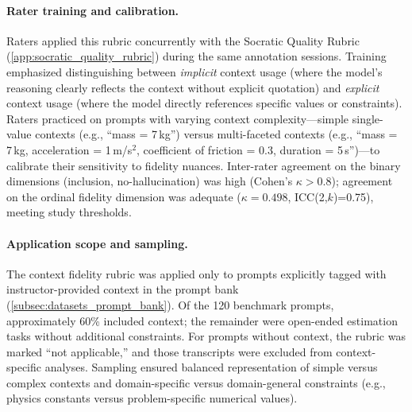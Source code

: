 \paragraph{Rater training and calibration.} Raters applied this rubric concurrently with the Socratic Quality Rubric (\cref{app:socratic_quality_rubric}) during the same annotation sessions. Training emphasized distinguishing between \textit{implicit} context usage (where the model's reasoning clearly reflects the context without explicit quotation) and \textit{explicit} context usage (where the model directly references specific values or constraints). Raters practiced on prompts with varying context complexity—simple single-value contexts (e.g., ``mass = 7\,kg'') versus multi-faceted contexts (e.g., ``mass = 7\,kg, acceleration = 1\,m/s$^2$, coefficient of friction = 0.3, duration = 5\,s'')—to calibrate their sensitivity to fidelity nuances. Inter-rater agreement on the binary dimensions (inclusion, no-hallucination) was high (Cohen's $\kappa > 0.8$); agreement on the ordinal fidelity dimension was adequate ($\kappa=0.498$, ICC(2,$k$)=0.75), meeting study thresholds.

\paragraph{Application scope and sampling.} The context fidelity rubric was applied only to prompts explicitly tagged with instructor-provided context in the prompt bank (\cref{subsec:datasets_prompt_bank}). Of the 120 benchmark prompts, approximately 60\% included context; the remainder were open-ended estimation tasks without additional constraints. For prompts without context, the rubric was marked ``not applicable,'' and those transcripts were excluded from context-specific analyses. Sampling ensured balanced representation of simple versus complex contexts and domain-specific versus domain-general constraints (e.g., physics constants versus problem-specific numerical values).

